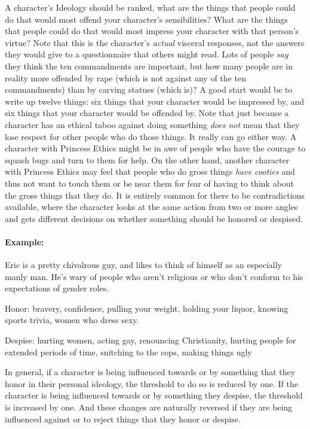 A character's Ideology should be ranked, what are the things that people could do that would most offend your character's sensibilities? What are the things that people could do that would most impress your character with that person's virtue? Note that this is the character's \textit{actual} visceral responses, not the answers they would give to a questionnaire that others might read. Lots of people \textit{say} they think the ten commandments are important, but how many people are in reality more offended by rape (which is not against any of the ten commandments) than by carving statues (which is)? A good start would be to write up twelve things: six things that your character would be impressed by, and six things that your character would be offended by. Note that just because a character has an ethical taboo against doing something \textit{does not} mean that they lose respect for other people who do those things. It really can go either way. A character with Princess Ethics might be in awe of people who have the courage to squash bugs and turn to them for help. On the other hand, another character with Princess Ethics may feel that people who do gross things \textit{have cooties} and thus not want to touch them or be near them for fear of having to think about the gross things that they do. It is entirely common for there to be contradictions available, where the character looks at the same action from two or more angles and gets different decisions on whether something should be honored or despised.

\paragraph{Example:} Eric is a pretty chivalrous guy, and likes to think of himself as an especially manly man. He's wary of people who aren't religious or who don't conform to his expectations of gender roles.
\begin{description*}
\item[Honor:] bravery, confidence, pulling your weight, holding your liquor, knowing sports trivia, women who dress sexy.
\item[Despise:] hurting women, acting gay, renouncing Christianity, hurting people for extended periods of time, snitching to the cops, making things ugly
\end{description*}


In general, if a character is being influenced towards or by something that they honor in their personal ideology, the threshold to do so is reduced by one. If the character is being influenced towards or by something they despise, the threshold is increased by one. And these changes are naturally reversed if they are being influenced against or to reject things that they honor or despise. 

